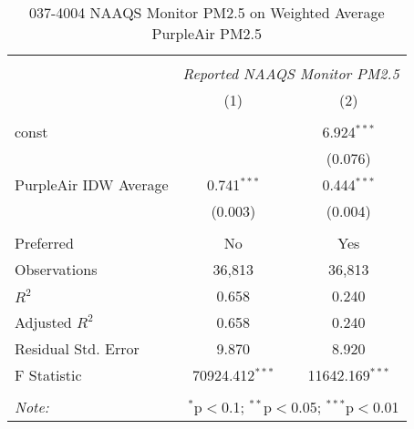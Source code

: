 \begin{table}[!htbp] \centering
  \caption{037-4004 NAAQS Monitor PM2.5 on Weighted Average PurpleAir PM2.5}
  \label{tab:reg_037-4004}
\begin{tabular}{@{\extracolsep{5pt}}lcc}
\\[-1.8ex]\hline
\hline \\[-1.8ex]
& \multicolumn{2}{c}{\textit{Reported NAAQS Monitor PM2.5}} \
\cr \cline{2-3}
\\[-1.8ex] & (1) & (2) \\
\hline \\[-1.8ex]
 const & & 6.924$^{***}$ \\
  & & (0.076) \\
 PurpleAir IDW Average & 0.741$^{***}$ & 0.444$^{***}$ \\
  & (0.003) & (0.004) \\
\hline \\[-1.8ex]
 Preferred & No & Yes \\
 Observations & 36,813 & 36,813 \\
 $R^2$ & 0.658 & 0.240 \\
 Adjusted $R^2$ & 0.658 & 0.240 \\
 Residual Std. Error & 9.870 & 8.920  \\
 F Statistic & 70924.412$^{***}$  & 11642.169$^{***}$  \\
\hline
\hline \\[-1.8ex]
\textit{Note:} & \multicolumn{2}{r}{$^{*}$p$<$0.1; $^{**}$p$<$0.05; $^{***}$p$<$0.01} \\
\end{tabular}
\end{table}